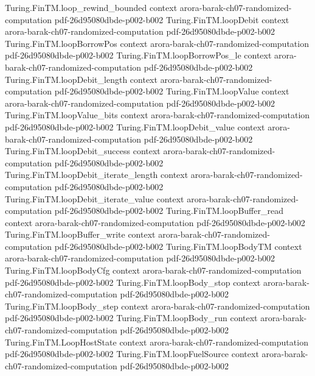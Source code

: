\begin{theorem}
  {Turing.FinTM.loop_rewind_bounded}
  {context}
  {arora-barak-ch07-randomized-computation}
  {pdf-26d95080dbde-p002-b002}
\proofstep
  {Turing.FinTM.loopDebit}
  {context}
  {arora-barak-ch07-randomized-computation}
  {pdf-26d95080dbde-p002-b002}
\proofstep
  {Turing.FinTM.loopBorrowPos}
  {context}
  {arora-barak-ch07-randomized-computation}
  {pdf-26d95080dbde-p002-b002}
\proofstep
  {Turing.FinTM.loopBorrowPos_le}
  {context}
  {arora-barak-ch07-randomized-computation}
  {pdf-26d95080dbde-p002-b002}
\proofstep
  {Turing.FinTM.loopDebit_length}
  {context}
  {arora-barak-ch07-randomized-computation}
  {pdf-26d95080dbde-p002-b002}
\proofstep
  {Turing.FinTM.loopValue}
  {context}
  {arora-barak-ch07-randomized-computation}
  {pdf-26d95080dbde-p002-b002}
\proofstep
  {Turing.FinTM.loopValue_bits}
  {context}
  {arora-barak-ch07-randomized-computation}
  {pdf-26d95080dbde-p002-b002}
\proofstep
  {Turing.FinTM.loopDebit_value}
  {context}
  {arora-barak-ch07-randomized-computation}
  {pdf-26d95080dbde-p002-b002}
\proofstep
  {Turing.FinTM.loopDebit_success}
  {context}
  {arora-barak-ch07-randomized-computation}
  {pdf-26d95080dbde-p002-b002}
\proofstep
  {Turing.FinTM.loopDebit_iterate_length}
  {context}
  {arora-barak-ch07-randomized-computation}
  {pdf-26d95080dbde-p002-b002}
\proofstep
  {Turing.FinTM.loopDebit_iterate_value}
  {context}
  {arora-barak-ch07-randomized-computation}
  {pdf-26d95080dbde-p002-b002}
\proofstep
  {Turing.FinTM.loopBuffer_read}
  {context}
  {arora-barak-ch07-randomized-computation}
  {pdf-26d95080dbde-p002-b002}
\proofstep
  {Turing.FinTM.loopBuffer_write}
  {context}
  {arora-barak-ch07-randomized-computation}
  {pdf-26d95080dbde-p002-b002}
\proofstep
  {Turing.FinTM.loopBodyTM}
  {context}
  {arora-barak-ch07-randomized-computation}
  {pdf-26d95080dbde-p002-b002}
\proofstep
  {Turing.FinTM.loopBodyCfg}
  {context}
  {arora-barak-ch07-randomized-computation}
  {pdf-26d95080dbde-p002-b002}
\proofstep
  {Turing.FinTM.loopBody_stop}
  {context}
  {arora-barak-ch07-randomized-computation}
  {pdf-26d95080dbde-p002-b002}
\proofstep
  {Turing.FinTM.loopBody_step}
  {context}
  {arora-barak-ch07-randomized-computation}
  {pdf-26d95080dbde-p002-b002}
\proofstep
  {Turing.FinTM.loopBody_run}
  {context}
  {arora-barak-ch07-randomized-computation}
  {pdf-26d95080dbde-p002-b002}
\proofstep
  {Turing.FinTM.LoopHostState}
  {context}
  {arora-barak-ch07-randomized-computation}
  {pdf-26d95080dbde-p002-b002}
\proofstep
  {Turing.FinTM.loopFuelSource}
  {context}
  {arora-barak-ch07-randomized-computation}
  {pdf-26d95080dbde-p002-b002}

\end{theorem}
